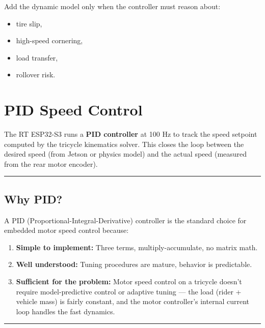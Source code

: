 \documentclass[12pt,a4paper,oneside]{report}
\providecommand{\tightlist}{\setlength{\itemsep}{0pt}\setlength{\parskip}{0pt}}
\begin{document}
Add the dynamic model only when the controller must reason about:

\begin{itemize}
\tightlist
\item
  tire slip,
\item
  high-speed cornering,
\item
  load transfer,
\item
  rollover risk.
\end{itemize}


\chapter{PID Speed Control}\label{pid-speed-control}

The RT ESP32-S3 runs a \textbf{PID controller} at 100 Hz to track the speed
setpoint computed by the tricycle kinematics solver. This closes the loop
between the desired speed (from Jetson or physics model) and the actual speed
(measured from the rear motor encoder).

\begin{center}\rule{0.5\linewidth}{0.5pt}\end{center}

\section{Why PID?}\label{why-pid}

A PID (Proportional-Integral-Derivative) controller is the standard choice for
embedded motor speed control because:

\begin{enumerate}
\def\labelenumi{\arabic{enumi}.}
\tightlist
\item
  \textbf{Simple to implement:} Three terms, multiply-accumulate, no matrix
  math.
\item
  \textbf{Well understood:} Tuning procedures are mature, behavior is
  predictable.
\item
  \textbf{Sufficient for the problem:} Motor speed control on a tricycle doesn't
  require model-predictive control or adaptive tuning --- the load (rider +
  vehicle mass) is fairly constant, and the motor controller's internal current
  loop handles the fast dynamics.
\end{enumerate}

\begin{center}\rule{0.5\linewidth}{0.5pt}\end{center}
\end{document}
